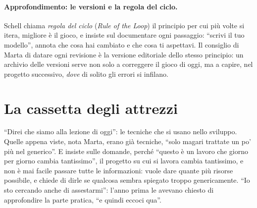 \paragraph{Approfondimento: le versioni e la regola del ciclo.} Schell chiama \emph{regola
del ciclo} (\emph{Rule of the Loop}) il principio per cui più volte si itera, migliore è il
gioco, e insiste sul documentare ogni passaggio: ``scrivi il tuo modello'', annota che cosa
hai cambiato e che cosa ti aspettavi. Il consiglio di Marta di datare ogni revisione è la
versione editoriale dello stesso principio: un archivio delle versioni serve non solo a
correggere il gioco di oggi, ma a capire, nel progetto successivo, \emph{dove} di solito gli
errori si infilano.

\section{La cassetta degli attrezzi}
\label{a14:sec:cassetta}

``Direi che siamo alla lezione di oggi'': le tecniche che si usano nello sviluppo. Quelle
appena viste, nota Marta, erano già tecniche, ``solo magari trattate un po' più nel
generico''. E insiste sulle domande, perché ``questo è un lavoro che giorno per giorno cambia
tantissimo'', il progetto su cui si lavora cambia tantissimo, e non è mai facile passare tutte
le informazioni: vuole dare quante più risorse possibile, e chiede di dirle se qualcosa
sembra spiegato troppo genericamente. ``Io sto cercando anche di assestarmi'': l'anno prima
le avevano chiesto di approfondire la parte pratica, ``e quindi eccoci qua''.


